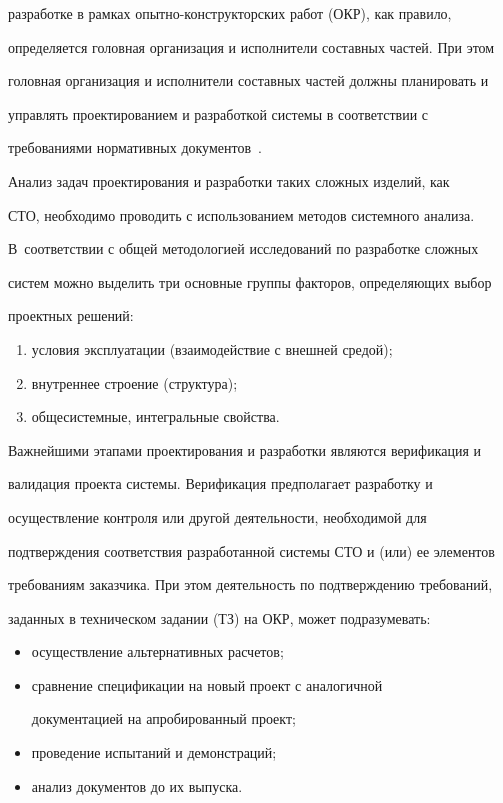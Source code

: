 разработке в рамках опыт\-но-кон\-ст\-рук\-тор\-ских работ (ОКР), как правило, 


определяется головная организация и исполнители составных частей. При этом 


головная организация и исполнители составных частей должны планировать и 


управлять проектированием и разработкой системы в соответствии с 


требованиями нормативных документов~\cite{19-gr, 20-gr}.


  


  Анализ задач проектирования и разработки таких сложных изделий, как 


СТО, необходимо проводить с использованием методов системного анализа. 


В~соответствии с общей методологией исследований по разработке сложных 


систем можно выделить три основные группы факторов, определяющих выбор 


проектных решений:


  \begin{enumerate}[(1)]


  \item условия эксплуатации (взаимодействие с внешней средой);


  \item внутреннее строение (структура); 


  \item общесистемные, интегральные свойства.


  \end{enumerate}


  


  Важнейшими этапами проектирования и разработки являются верификация и 


валидация проекта системы. Верификация предполагает разработку и 


осуществление контроля или другой деятельности, необходимой для 


подтверждения соответствия разработанной системы СТО и (или) ее элементов 


требованиям заказчика. При этом деятельность по подтверждению требований, 


заданных в техническом задании (ТЗ) на ОКР, может подразумевать:


  \begin{itemize}


  \item  осуществление альтернативных расчетов;


  \item  сравнение спецификации на новый проект с аналогичной 


документацией на апробированный проект;


  \item проведение испытаний и демонстраций;


  \item анализ документов до их выпуска.


  \end{itemize}


